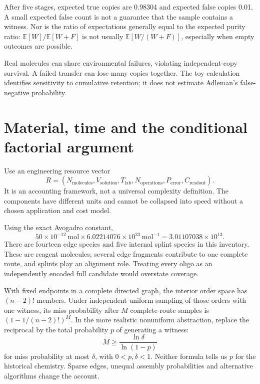 After five stages, expected true copies are 0.98304 and expected false copies 0.01. A small expected false count is not a guarantee that the sample contains a witness. Nor is the ratio of expectations generally equal to the expected purity ratio: $\mathbb E[W]/\mathbb E[W+F]$ is not usually $\mathbb E[W/(W+F)]$, especially when empty outcomes are possible.

Real molecules can share environmental failures, violating independent-copy survival. A failed transfer can lose many copies together. The toy calculation identifies sensitivity to cumulative retention; it does not estimate Adleman's false-negative probability.

\section{Material, time and the conditional factorial argument}
Use an engineering resource vector
\[
R=(N_{\mathrm{molecules}},V_{\mathrm{solution}},T_{\mathrm{lab}},
N_{\mathrm{operations}},P_{\mathrm{error}},C_{\mathrm{readout}}).
\]
It is an accounting framework, not a universal complexity definition. The components have different units and cannot be collapsed into speed without a chosen application and cost model.


Using the exact Avogadro constant,\cite{si}
\[
50\times10^{-12}\ \mathrm{mol}\times
6.02214076\times10^{23}\ \mathrm{mol}^{-1}
=3.01107038\times10^{13}.
\]
There are fourteen edge species and five internal splint species in this inventory. These are reagent molecules; several edge fragments contribute to one complete route, and splints play an alignment role. Treating every oligo as an independently encoded full candidate would overstate coverage.

With fixed endpoints in a complete directed graph, the interior order space has $(n-2)!$ members. Under independent uniform sampling of those orders with one witness, its miss probability after $M$ complete-route samples is $(1-1/(n-2)!)^M$. In the more realistic nonuniform abstraction, replace the reciprocal by the total probability $p$ of generating a witness:
\[
M\ge\frac{\ln\delta}{\ln(1-p)}
\]
for miss probability at most $\delta$, with $0<p,\delta<1$. Neither formula tells us $p$ for the historical chemistry. Sparse edges, unequal assembly probabilities and alternative algorithms change the account.

